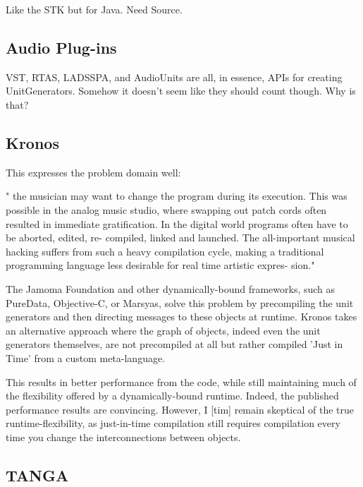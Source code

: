 \documentclass[twoside,10pt]{article}
\begin{document}
Like the STK but for Java.  Need Source.


\subsection{Audio Plug-ins} %

VST, RTAS, LADSSPA, and AudioUnits are all, in essence, APIs for creating UnitGenerators.  Somehow it doesn't seem like they should count though.  Why is that?


\subsection{Kronos} %

This expresses the problem domain well:

" the musician may want to change the program during its execution. This was possible in the analog music studio, where swapping out patch cords often resulted in immediate gratification. In the digital world programs often have to be aborted, edited, re- compiled, linked and launched. The all-important musical hacking suffers from such a heavy compilation cycle, making a traditional programming language less desirable for real time artistic expres- sion." \cite{Norilo:2009}

The Jamoma Foundation and other dynamically-bound frameworks, such as PureData, Objective-C, or Marsyas, solve this problem by precompiling the unit generators and then directing messages to these objects at runtime.  Kronos takes an alternative approach where the graph of objects, indeed even the unit generators themselves, are not precompiled at all but rather compiled 'Just in Time' from a custom meta-language. 

This results in better performance from the code, while still maintaining much of the flexibility offered by a dynamically-bound runtime.  Indeed, the published performance results are convincing.  However, I [tim] remain skeptical of the true runtime-flexibility, as just-in-time compilation still requires compilation every time you change the interconnections between objects.


\subsection{TANGA} %
\end{document}
